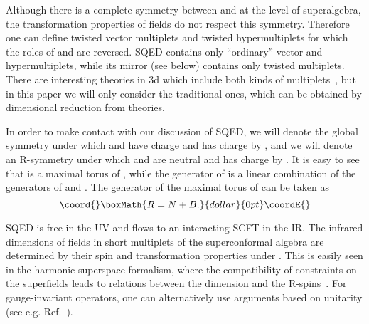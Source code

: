 \documentclass[a4paper,12pt, amsfonts, amssymb]{article}
\providecommand{\tQ}{{\tilde Q}}
\begin{document}
Although there is a complete symmetry between \coordHE{} and \coordHE{} at
the level of superalgebra, the transformation properties of
fields do not respect this symmetry. Therefore one can define twisted
vector multiplets and twisted hypermultiplets for which the roles of
\coordHE{} and \coordHE{} are reversed. \coordHE{} SQED contains only
``ordinary'' vector and hypermultiplets, while its mirror (see below)
contains only twisted multiplets. There are interesting \coordHE{} theories in 3d
which include both kinds of multiplets~\cite{BG,KS}, but in this paper we
will only consider the traditional ones, which can be obtained by dimensional
reduction from \coordHE{}  \coordHE{} theories.

In order to make contact with our discussion of
\coordHE{} SQED, we will denote the global \coordHE{} symmetry under which
\coordHE{} and \myHighlight{$\tQ$}\coordHE{} have charge \coordHE{} and \myHighlight{$\Phi$}\coordHE{} has charge \coordHE{} by \coordHE{},
and we will denote an R-symmetry under which \coordHE{} and \myHighlight{$\tQ$}\coordHE{} are neutral
and \myHighlight{$\Phi$}\coordHE{} has charge \coordHE{} by \coordHE{}. It is easy to see that \coordHE{}
is a maximal torus of \coordHE{}, while the generator of \coordHE{}
is a linear combination of the generators of \coordHE{} and \coordHE{}.
The generator of the maximal torus of \coordHE{} can be taken as
$$\coord{}\boxMath{
R=N+B.
}{dollar}{0pt}\coordE{}$$

\coordHE{} SQED is free in the UV and flows to an interacting SCFT in the IR.
The infrared dimensions of fields in short multiplets of the superconformal
algebra are determined by their spin and transformation properties under
\coordHE{}.  This is easily seen in the harmonic superspace
formalism, where the compatibility of constraints on the superfields leads to
relations between the dimension and the R-spins~\cite{HS}. For gauge-invariant
operators, one can alternatively use arguments based on unitarity (see
e.g. Ref.~\cite{Minwalla}). 
\end{document}
